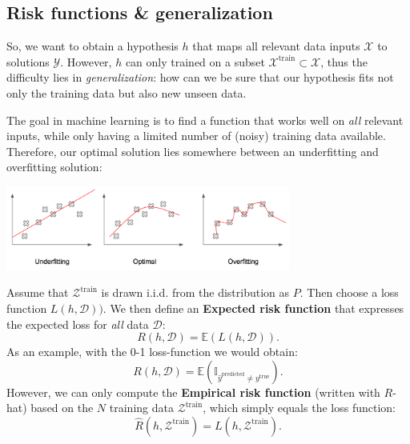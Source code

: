 \documentclass{article}
\begin{document}
\subsection{Risk functions \& generalization}
So, we want to obtain a hypothesis $h$ that maps all relevant data inputs $\mathcal{X}$ to solutions $\mathcal{Y}$. However, $h$ can only trained on a subset $\mathcal{X}^\text{train}\subset\mathcal{X}$, thus the difficulty lies in \textit{generalization}: how can we be sure that our hypothesis fits not only the training data but also new unseen data.
\begin{testexample}
    The goal in machine learning is to find a function that works well on \textit{all} relevant inputs, while only having a limited number of (noisy) training data available. Therefore, our optimal solution lies somewhere between an underfitting and overfitting solution:\\
    \begin{center}\includegraphics[width=0.7\textwidth]{Overfitting.png}\end{center}\vspace{-0.5cm}
\end{testexample}
{\flushleft Assume} that $\mathcal{Z}^\text{train}$ is drawn i.i.d. from the distribution as $P$. Then choose a loss function $L(h,\mathcal{D}))$. We then define an \textbf{Expected risk function} that expresses the expected loss for \textit{all} data $\mathcal{D}$:
\begin{equation}
    R(h,\mathcal{D}) = \mathbb{E}(L(h,\mathcal{D})).\label{eq:exprisk}
\end{equation}
As an example, with the 0-1 loss-function we would obtain:
\begin{equation}
    R(h,\mathcal{D}) = \mathbb{E}(\mathbb{I}_{\hat{y}^\text{predicted}\neq y^\text{true}}).
\end{equation}
However, we can only compute the \textbf{Empirical risk function} (written with $R$-hat) based on the $N$ training data $\mathcal{Z}^\text{train}$, which simply equals the loss function:
\begin{equation}
    \hat{R}(h,\mathcal{Z}^\text{train}) = L(h,\mathcal{Z}^\text{train})\label{eq:emprisk}.
\end{equation}
\end{document}

